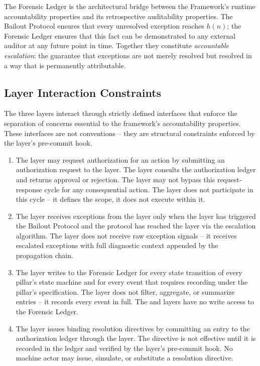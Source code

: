 The Forensic Ledger is the architectural bridge between the \bxthree{}
Framework's runtime accountability properties and its retrospective auditability
properties.  The Bailout Protocol ensures that every unresolved exception reaches
$h(n)$; the Forensic Ledger ensures that this fact can be demonstrated to any
external auditor at any future point in time.  Together they constitute
\textit{accountable escalation}: the guarantee that exceptions are not merely
resolved but resolved in a way that is permanently attributable.

\subsection{Layer Interaction Constraints}\label{sec:layer-constraints}

The three layers interact through strictly defined interfaces that enforce the
separation of concerns essential to the framework's accountability properties.
These interfaces are not conventions -- they are structural constraints
enforced by the \fact{} layer's pre-commit hook.

\begin{enumerate}
\item[\textbf{IC-1.}] The \bounds{} layer may request authorization for an action
by submitting an authorization request to the \fact{} layer.  The \fact{} layer
consults the authorization ledger and returns approval or rejection.  The
\bounds{} layer may not bypass this request-response cycle for any consequential
action.  The \purpose{} layer does not participate in this cycle -- it defines
the scope, it does not execute within it.

\item[\textbf{IC-2.}] The \purpose{} layer receives exceptions from the
\fact{} layer only when the \bounds{} layer has triggered the Bailout Protocol
and the protocol has reached the \purpose{} layer via the escalation algorithm.
The \purpose{} layer does not receive raw exception signals -- it receives
escalated exceptions with full diagnostic context appended by the propagation
chain.

\item[\textbf{IC-3.}] The \fact{} layer writes to the Forensic Ledger for every
state transition of every pillar's state machine and for every event that
requires recording under the pillar's specification.  The \fact{} layer does not
filter, aggregate, or summarize entries -- it records every event in full.
The \purpose{} and \bounds{} layers have no write access to the Forensic Ledger.

\item[\textbf{IC-4.}] The \purpose{} layer issues binding resolution directives
by committing an entry to the authorization ledger through the \fact{} layer.
The directive is not effective until it is recorded in the ledger and verified
by the \fact{} layer's pre-commit hook.  No machine actor may issue, simulate,
or substitute a resolution directive.
\end{enumerate}


